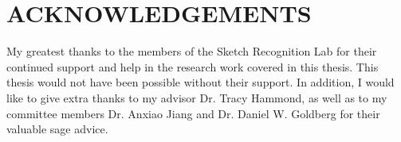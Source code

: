 %
%
%


\chapter*{ACKNOWLEDGEMENTS}


\indent My greatest thanks to the members of the Sketch Recognition Lab for their
continued support and help in the research work covered in this thesis. This thesis
would not have been possible without their support. In addition, I would like to give
extra thanks to my advisor Dr. Tracy Hammond, as well as to my committee members
Dr. Anxiao Jiang and Dr. Daniel W. Goldberg for their valuable sage advice.


\pagebreak{}
